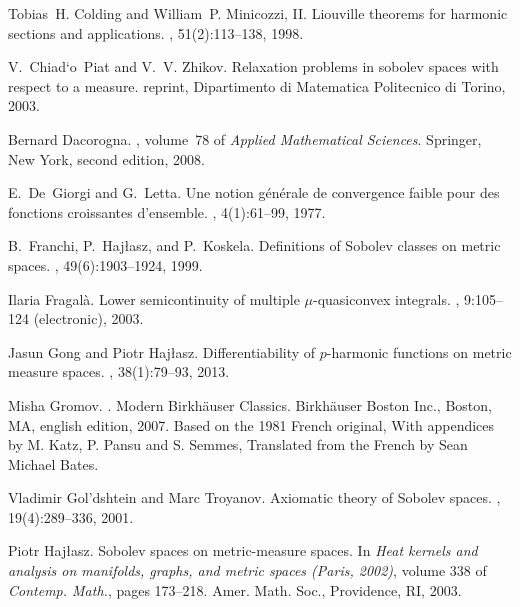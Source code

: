 \documentclass[10pt]{amsart}
\numberwithin{equation}{section}
\theoremstyle{definition}
\theoremstyle{remark}
\begin{document}
\begin{thebibliography}{AHM04}
Tobias~H. Colding and William~P. Minicozzi, II.
\newblock Liouville theorems for harmonic sections and applications.
, 51(2):113--138, 1998.

V.~Chiad`o~Piat and V.~V. Zhikov.
\newblock Relaxation problems in sobolev spaces with respect to a measure.
reprint, {D}ipartimento di {M}atematica {P}olitecnico di {T}orino,
  2003.

Bernard Dacorogna.
, volume~78 of {\em
  Applied Mathematical Sciences}.
\newblock Springer, New York, second edition, 2008.

E.~De~Giorgi and G.~Letta.
\newblock Une notion g\'en\'erale de convergence faible pour des fonctions
  croissantes d'ensemble.
, 4(1):61--99, 1977.

B.~Franchi, P.~Haj{\l}asz, and P.~Koskela.
\newblock Definitions of {S}obolev classes on metric spaces.
, 49(6):1903--1924, 1999.

Ilaria Fragal{\`a}.
\newblock Lower semicontinuity of multiple {$\mu$}-quasiconvex integrals.
, 9:105--124 (electronic), 2003.

Jasun Gong and Piotr Haj{\l}asz.
\newblock Differentiability of {$p$}-harmonic functions on metric measure
  spaces.
, 38(1):79--93, 2013.

Misha Gromov.
.
\newblock Modern Birkh\"auser Classics. Birkh\"auser Boston Inc., Boston, MA,
  english edition, 2007.
\newblock Based on the 1981 French original, With appendices by M. Katz, P.
  Pansu and S. Semmes, Translated from the French by Sean Michael Bates.

Vladimir Gol'dshtein and Marc Troyanov.
\newblock Axiomatic theory of {S}obolev spaces.
, 19(4):289--336, 2001.

Piotr Haj{\l}asz.
\newblock Sobolev spaces on metric-measure spaces.
\newblock In {\em Heat kernels and analysis on manifolds, graphs, and metric
  spaces ({P}aris, 2002)}, volume 338 of {\em Contemp. Math.}, pages 173--218.
  Amer. Math. Soc., Providence, RI, 2003.


\end{thebibliography}
\end{document}
